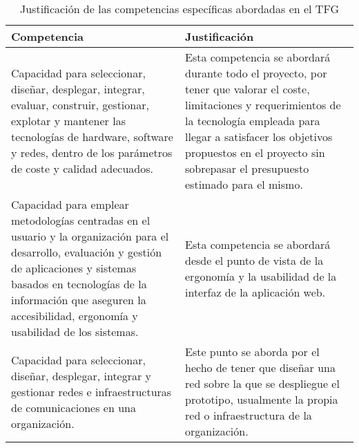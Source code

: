 \documentclass{pre-tfg}
\begin{document}
\begin{table}[hp]
  \centering
  \caption{Justificación de las competencias específicas abordadas en el TFG}
  \label{tab:competencias}

  \begin{tabular}{p{0.5\linewidth}p{0.5\linewidth}}
    \textbf{Competencia} & \textbf{Justificación} \\
    \hline
    Capacidad para seleccionar, diseñar, desplegar, integrar, evaluar, construir, gestionar, explotar y mantener las tecnologías de hardware, software y redes, dentro de los parámetros de coste y calidad adecuados.& Esta competencia se abordará durante todo el proyecto, por tener que valorar el coste, limitaciones y requerimientos de la tecnología empleada para llegar a satisfacer los objetivos propuestos en el proyecto sin sobrepasar el presupuesto estimado para el mismo. \\
    Capacidad para emplear metodologías centradas en el usuario y la organización para el desarrollo, evaluación y gestión de aplicaciones y sistemas basados en tecnologías de la información que aseguren la accesibilidad, ergonomía y usabilidad de los sistemas.& Esta competencia se abordará desde el punto de vista de la ergonomía y la usabilidad de la interfaz de la aplicación web.  \\
    Capacidad para seleccionar, diseñar, desplegar, integrar y gestionar redes e infraestructuras de comunicaciones en una organización.& Este punto se aborda por el hecho de tener que diseñar una red sobre la que se despliegue el prototipo, usualmente la propia red o infraestructura de la organización. \\

    \hline
  \end{tabular}
\end{table}
\end{document}

